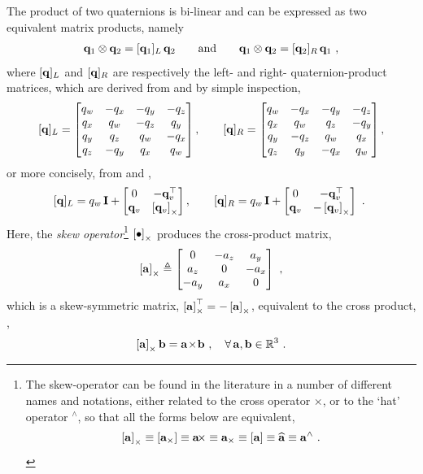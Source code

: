 The product of two quaternions is bi-linear and can be expressed as two equivalent matrix products, namely
%
\begin{align}
{\bf q}_1\otimes{\bf q}_2 = [{\bf q}_1]_L\,{\bf q}_2 
\qquad \textrm{and} \qquad
{\bf q}_1\otimes{\bf q}_2 = [{\bf q}_2]_R\,{\bf q}_1 ~, \label{equ:quatMatProd}
\end{align}%
%
where $[{\bf q}]_L$ and $[{\bf q}]_R$ are respectively the left- and right- quaternion-product matrices, which are derived from  and  by simple inspection,
%
\begin{align}
[{\bf q}]_L = \begin{bmatrix}
q_w &-q_x &-q_y &-q_z\\
q_x & q_w &-q_z & q_y\\
q_y & q_z & q_w &-q_x\\
q_z &-q_y & q_x & q_w\\
\end{bmatrix}, \qquad
[{\bf q}]_R = \begin{bmatrix}
q_w &-q_x &-q_y &-q_z\\
q_x & q_w & q_z &-q_y\\
q_y &-q_z & q_w & q_x\\
q_z & q_y &-q_x & q_w\\
\end{bmatrix} ,
\label{equ:quatMatrixComponents}
\end{align}%
%
or more concisely, from  and , 
%
\begin{align}
[{\bf q}]_L = q_w\,{\bf I} + \begin{bmatrix}
0 & -{\bf q}_v^{\top} \\
{\bf q}_v & \left[{\bf q}_v\right]_\times
\end{bmatrix}, \qquad
[{\bf q}]_R = q_w\,{\bf I} + \begin{bmatrix}
0 & -{\bf q}_v^{\top} \\
{\bf q}_v & -\left[{\bf q}_v\right]_\times
\end{bmatrix}~.
\label{equ:quatMatrix}
 ~
\end{align}%
%
Here, the \emph{skew operator}\footnote{The skew-operator can be found in the literature in a number of different names and notations, either related to the cross operator $\times$, or to the `hat' operator $^\wedge$, so that all the forms below are equivalent,
$$
\left[{\bf a}\right]_\times \equiv [{\bf a}_\times] \equiv {\bf a}\!\times \equiv {\bf a}_\times \equiv [{\bf a}] \equiv \widehat{{\bf a}} \equiv {\bf a}^\wedge~.
$$
} 
%
$\left[\bullet\right]_\times$ produces the cross-product matrix,
%
\begin{align}
\left[{\bf a}\right]_\times \triangleq \begin{bmatrix}
0 & -a_z & a_y \\
a_z & 0 & -a_x \\
-a_y & a_x & 0
\end{bmatrix}
\label{equ:skew}
~,
\end{align}
%
which is a skew-symmetric matrix, $\left[{\bf a}\right]_\times^{\top}=-\left[{\bf a}\right]_\times$, equivalent to the cross product, \ie, 
%
\begin{align}
\left[{\bf a}\right]_\times{\bf b} = {\bf a}\!\times\!{\bf b}~,\quad \forall\, {\bf a},{\bf b}\in{\mathbb R}^3 ~.  
\end{align}



